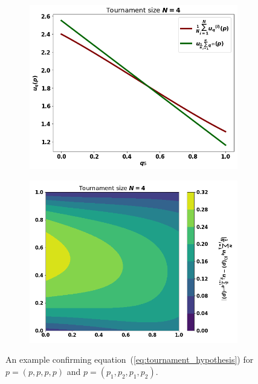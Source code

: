 \documentclass[10pt]{article}
\begin{document}
\begin{figure}[!htbp]
    \begin{center}
        \begin{subfigure}{0.44\textwidth}
            \includegraphics[width=\linewidth]{img/mean_vs_average.png}
        \end{subfigure}
        \begin{subfigure}{0.45\textwidth}
            \includegraphics[width=\linewidth]{img/mean_vs_average_two.png}
        \end{subfigure}
    \end{center}
    \caption{An example confirming equation~(\ref{eq:tournament_hypothesis}) for \(p=(p, p, p, p)\)
    and \(p= (p_1, p_2, p_1, p_2)\).}
    \label{fig:hypothesis}
\end{figure}
\end{document}

